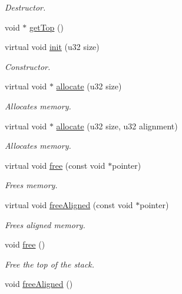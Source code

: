 \begin{DoxyCompactItemize}
\begin{DoxyCompactList}\small\item\em Destructor. \end{DoxyCompactList}\item 
void $\ast$ \hyperlink{classDE_1_1StackAllocator_a338da3513a5d49abb8ac7191b5201c37}{get\+Top} ()
\item 
virtual void \hyperlink{classDE_1_1StackAllocator_a529ba39bd01e84cdb140db3343a7bf50}{init} (u32 size)
\begin{DoxyCompactList}\small\item\em Constructor. \end{DoxyCompactList}\item 
virtual void $\ast$ \hyperlink{classDE_1_1StackAllocator_a4b360ed983169d4063d0b85ac83ec156}{allocate} (u32 size)
\begin{DoxyCompactList}\small\item\em Allocates memory. \end{DoxyCompactList}\item 
virtual void $\ast$ \hyperlink{classDE_1_1StackAllocator_afa3e49ff8c47278c25e8ffcfa7897a80}{allocate} (u32 size, u32 alignment)
\begin{DoxyCompactList}\small\item\em Allocates memory. \end{DoxyCompactList}\item 
virtual void \hyperlink{classDE_1_1StackAllocator_ae1c77f32df6421293da96dc322f33c98}{free} (const void $\ast$pointer)
\begin{DoxyCompactList}\small\item\em Frees memory. \end{DoxyCompactList}\item 
virtual void \hyperlink{classDE_1_1StackAllocator_aac3d433b63805fbd046a3ce70d6d6305}{free\+Aligned} (const void $\ast$pointer)
\begin{DoxyCompactList}\small\item\em Frees aligned memory. \end{DoxyCompactList}\item 
void \hyperlink{classDE_1_1StackAllocator_a30cba40c244648427e741766d2f26ab7}{free} ()\hypertarget{classDE_1_1StackAllocator_a30cba40c244648427e741766d2f26ab7}{}\label{classDE_1_1StackAllocator_a30cba40c244648427e741766d2f26ab7}

\begin{DoxyCompactList}\small\item\em Free the top of the stack. \end{DoxyCompactList}\item 
void \hyperlink{classDE_1_1StackAllocator_ab85d29fe77b49d3b809ddb89ea2e0ed6}{free\+Aligned} ()\hypertarget{classDE_1_1StackAllocator_ab85d29fe77b49d3b809ddb89ea2e0ed6}{}\label{classDE_1_1StackAllocator_ab85d29fe77b49d3b809ddb89ea2e0ed6}


\end{DoxyCompactItemize}
